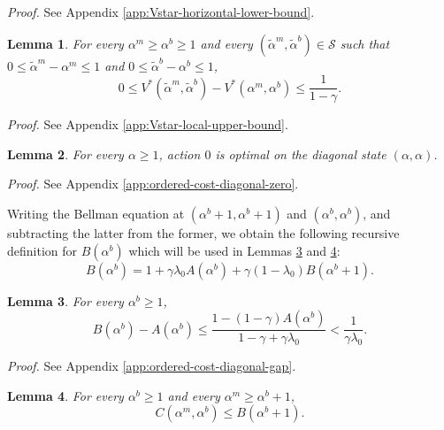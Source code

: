 \documentclass[letterpaper,journal]{IEEEtran}
\newtheorem{lemma}{Lemma}
\begin{document}
\emph{Proof.} See Appendix \ref{app:Vstar-horizontal-lower-bound}.



\begin{lemma}\label{lemma:Vstar-local-upper-bound}
For every $\alpha^m\geq \alpha^b\geq 1$ and every $(\tilde\alpha^m,\tilde\alpha^b)\in\mathcal S$ such that $0\leq \tilde\alpha^m-\alpha^m\leq 1$ and $0\leq \tilde\alpha^b-\alpha^b\leq 1$,
\begin{equation}\label{eq:Vstar-local-upper-bound}
0\leq V^*(\tilde\alpha^m,\tilde\alpha^b)-V^*(\alpha^m,\alpha^b)\leq \frac{1}{1-\gamma}.
\end{equation}
\end{lemma}

\emph{Proof.} See Appendix \ref{app:Vstar-local-upper-bound}.



\begin{lemma}\label{lemma:ordered-cost-diagonal-zero}
For every $\alpha\geq 1$, action $0$ is optimal on the diagonal state $(\alpha,\alpha)$.
\end{lemma}

\emph{Proof.} See Appendix \ref{app:ordered-cost-diagonal-zero}.


Writing the Bellman equation at $(\alpha^b+1,\alpha^b+1)$ and $(\alpha^b,\alpha^b)$, and subtracting the latter from the former, we obtain the following recursive definition for $B(\alpha^b)$ which will be used in Lemmas \ref{lemma:ordered-cost-diagonal-gap} and \ref{lemma:ordered-cost-vertical-bound}: 
\begin{equation}\label{eq:ordered-cost-diagonal-recursion}
B(\alpha^b)=1+\gamma\lambda_0A(\alpha^b)+\gamma(1-\lambda_0)B(\alpha^b+1).
\end{equation}



\begin{lemma}\label{lemma:ordered-cost-diagonal-gap}
For every $\alpha^b\geq 1$,
\begin{equation}\label{eq:ordered-cost-gap-bound}
B(\alpha^b)-A(\alpha^b)\leq
\frac{1-(1-\gamma)A(\alpha^b)}{1-\gamma+\gamma\lambda_0} < \frac{1}{\gamma\lambda_0}.
\end{equation}
\end{lemma}

\emph{Proof.} See Appendix \ref{app:ordered-cost-diagonal-gap}.


\begin{lemma}\label{lemma:ordered-cost-vertical-bound}
For every $\alpha^b \ge 1$ and every $\alpha^m \ge \alpha^b+1$,
\[
C(\alpha^m,\alpha^b)\le B(\alpha^b+1).
\]
\end{lemma}
\end{document}
